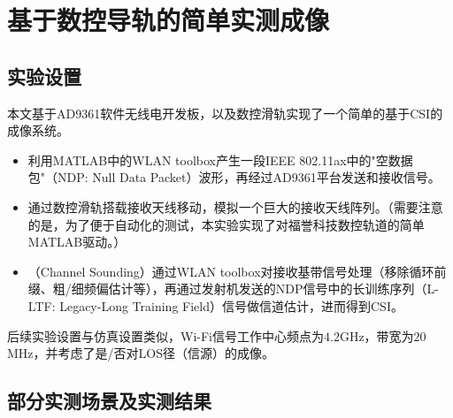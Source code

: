 \section{基于数控导轨的简单实测成像}
\subsection{实验设置}
本文基于AD9361软件无线电开发板，以及数控滑轨实现了一个简单的基于CSI的成像系统。
\begin{itemize}
  \item 利用MATLAB中的WLAN toolbox\cite{wlantoolbox}产生一段IEEE 802.11ax\cite{ong2011ieee}中的"空数据包"（NDP: Null Data Packet）波形\cite{perahia2013next}，再经过AD9361平台发送和接收信号。
  \item 通过数控滑轨搭载接收天线移动，模拟一个巨大的接收天线阵列。（需要注意的是，为了便于自动化的测试，本实验实现了对福誉科技数控轨道\cite{fuyu}的简单MATLAB驱动。）
  \item （Channel Sounding）通过WLAN toolbox对接收基带信号处理（移除循环前缀、粗/细频偏估计等），再通过发射机发送的NDP信号中的长训练序列（L-LTF: Legacy-Long Training Field）信号做信道估计，进而得到CSI\cite{ma2019wifi}\cite{perahia2013next}。
\end{itemize}
后续实验设置与仿真设置类似，Wi-Fi信号工作中心频点为$4.2$GHz，带宽为$20$MHz，并考虑了是/否对LOS径（信源）的成像。
\subsection{部分实测场景及实测结果}
